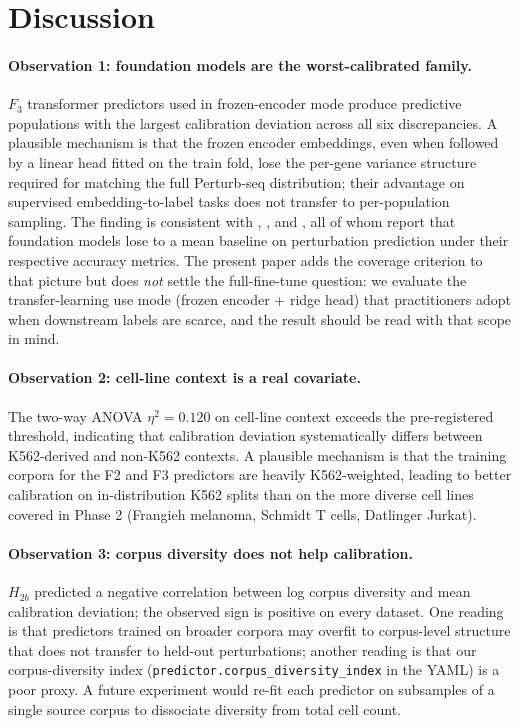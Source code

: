 \documentclass[11pt]{article}
\begin{document}
\section{Discussion}
\label{sec:discussion}

\paragraph{Observation 1: foundation models are the worst-calibrated
family.}
$F_3$ transformer predictors used in frozen-encoder mode produce
predictive populations with the largest calibration deviation across
all six discrepancies. A plausible mechanism is that the frozen
encoder embeddings, even when followed by a linear head fitted on the
train fold, lose the per-gene variance structure required for matching
the full Perturb-seq distribution; their advantage on supervised
embedding-to-label tasks does not transfer to per-population sampling.
The finding is consistent with \citet{ahlmann2025deep},
\citet{csendes2025train}, and \citet{kedzierska2025zeroshot}, all of
whom report that foundation models lose to a mean baseline on
perturbation prediction under their respective accuracy metrics. The
present paper adds the coverage criterion to that picture but does
\emph{not} settle the full-fine-tune question: we evaluate the
transfer-learning use mode (frozen encoder + ridge head) that
practitioners adopt when downstream labels are scarce, and the result
should be read with that scope in mind.

\paragraph{Observation 2: cell-line context is a real covariate.}
The two-way ANOVA $\eta^2 = 0.120$ on cell-line context exceeds the
pre-registered threshold, indicating that calibration deviation
systematically differs between K562-derived and non-K562 contexts. A
plausible mechanism is that the training corpora for the F2 and F3
predictors are heavily K562-weighted, leading to better calibration on
in-distribution K562 splits than on the more diverse cell lines covered
in Phase 2 (Frangieh melanoma, Schmidt T cells, Datlinger Jurkat).

\paragraph{Observation 3: corpus diversity does not help calibration.}
$H_{2b}$ predicted a negative correlation between log corpus diversity
and mean calibration deviation; the observed sign is positive on every
dataset. One reading is that predictors trained on broader corpora may
overfit to corpus-level structure that does not transfer to held-out
perturbations; another reading is that our corpus-diversity index
(\texttt{predictor.corpus\_diversity\_index} in the YAML) is a poor
proxy. A future experiment would re-fit each predictor on subsamples of
a single source corpus to dissociate diversity from total cell count.
\end{document}
